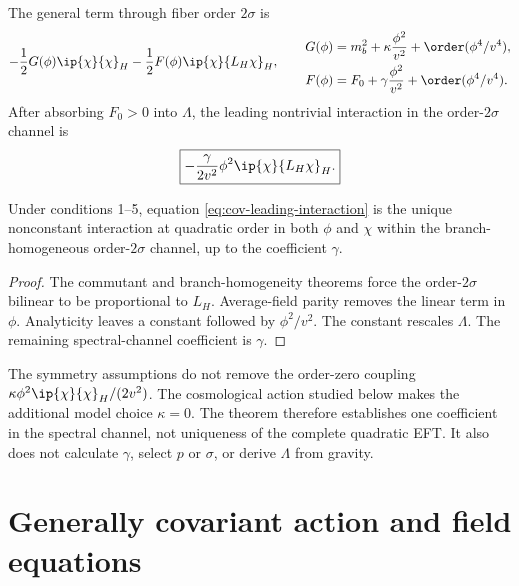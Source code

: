The general term through fiber order $2\sigma$ is
\begin{equation}
-\frac12G(\phi)\ip{\chi}{\chi}_H
-\frac12F(\phi)\ip{\chi}{L_H\chi}_H,
\qquad
\begin{aligned}
G(\phi)&=m_b^2+\kappa\frac{\phi^2}{v^2}+\order(\phi^4/v^4),\\
F(\phi)&=F_0+\gamma\frac{\phi^2}{v^2}+\order(\phi^4/v^4).
\end{aligned}
\label{eq:cov-Fexpansion}
\end{equation}
After absorbing $F_0>0$ into $\Lambda$, the leading nontrivial interaction in the order-$2\sigma$ channel is
\begin{equation}
\boxed{
-\frac{\gamma}{2v^2}\phi^2\ip{\chi}{L_H\chi}_H.}
\label{eq:cov-leading-interaction}
\end{equation}

\begin{theorem}
Under conditions 1--5, equation \eqref{eq:cov-leading-interaction} is the unique nonconstant interaction at quadratic order in both $\phi$ and $\chi$ within the branch-homogeneous order-$2\sigma$ channel, up to the coefficient $\gamma$.
\end{theorem}

\begin{proof}
The commutant and branch-homogeneity theorems force the order-$2\sigma$ bilinear to be proportional to $L_H$.  Average-field parity removes the linear term in $\phi$.  Analyticity leaves a constant followed by $\phi^2/v^2$.  The constant rescales $\Lambda$.  The remaining spectral-channel coefficient is $\gamma$.
\end{proof}

\begin{negativebox}
The symmetry assumptions do not remove the order-zero coupling $\kappa\phi^2\ip{\chi}{\chi}_H/(2v^2)$.  The cosmological action studied below makes the additional model choice $\kappa=0$.  The theorem therefore establishes one coefficient in the spectral channel, not uniqueness of the complete quadratic EFT.  It also does not calculate $\gamma$, select $p$ or $\sigma$, or derive $\Lambda$ from gravity.
\end{negativebox}

\section{Generally covariant action and field equations}


